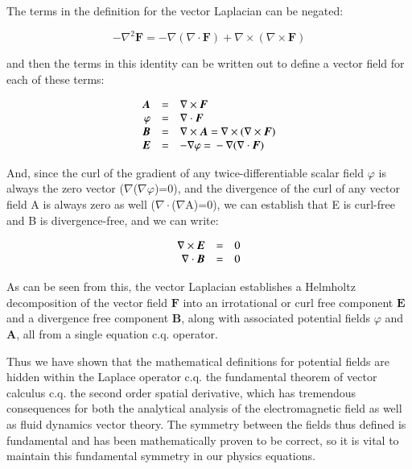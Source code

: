 \documentclass[twoside,final]{article}
\begin{document}
{The terms in the definition for the vector Laplacian can be negated:

\begin{equation}
-\nabla ^2\boldsymbol F=-\nabla (\nabla \cdot \boldsymbol F)+\nabla \times (\nabla \times \boldsymbol F)
\end{equation}

and then the terms in this identity can be written out to define a vector field
for each of these terms:  

\begin{equation}\label{seq:refText5}
\begin{matrix}\hfill \boldsymbol A&=&\nabla \times \boldsymbol F\hfill\null \\\hfill \varphi &=&\nabla \cdot
\boldsymbol F\hfill\null \\\hfill \boldsymbol B&=&\nabla \times \boldsymbol A\text{ = }\nabla \times
(\nabla \times \boldsymbol F)\hfill\null \\\hfill \boldsymbol E&=&-\nabla \varphi \text{ = }-\nabla (\nabla
\cdot \boldsymbol F)\hfill\null \end{matrix}
\end{equation}

And, since the curl of the gradient of any twice-differentiable scalar field
$\varphi $ is always the zero vector (${\nabla}${\texttimes}(${\nabla}$$\varphi
$)=0), and the divergence of the curl of any vector field A is always zero as
well (${\nabla}{\cdot}$(${\nabla}${\texttimes}A)=0), we can establish that E is
curl-free and B is divergence-free, and we can write: 

\begin{equation}
\begin{matrix}\hfill \nabla \times \boldsymbol E&=&0\hfill\null \\\hfill \nabla \cdot \boldsymbol
B&=&0\hfill\null \end{matrix}
\end{equation}

As can be seen from this, the vector Laplacian establishes a Helmholtz
decomposition of the vector field $\boldsymbol F$ into an irrotational or curl
free component $\boldsymbol E$ and a divergence free component $\boldsymbol B$,
along with associated potential fields $\varphi$ and $\boldsymbol A$, all from a
single equation c.q. operator. 

Thus we have shown that the mathematical definitions for potential fields are
hidden within the Laplace operator c.q. the fundamental theorem of vector
calculus c.q. the second order spatial derivative, which has tremendous
consequences for both the analytical analysis of the electromagnetic field as
well as fluid dynamics vector theory. The symmetry between the fields thus
defined is fundamental and has been mathematically proven to be correct, so it
is vital to maintain this fundamental symmetry in our physics equations. 

}
\end{document}
